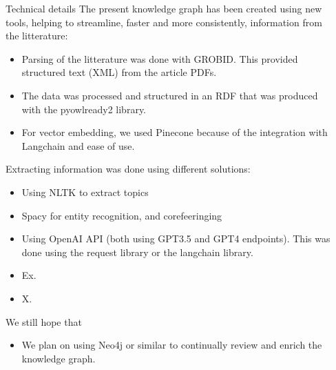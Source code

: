 \documentclass[final]{beamer}
\newlength{\sepmargin}
\newlength{\onecolwid}
\begin{document}
\begin{frame}[t]
\begin{columns}[t]
\begin{column}{\onecolwid}
         \begin{block}{Technical details}
          The present knowledge graph has been created using new tools, helping to streamline, faster and more consistently, information from the litterature:
           \begin{itemize}
\item Parsing of the litterature was done with GROBID. This provided structured text (XML) from the article PDFs. 
\item The data was processed and structured in an RDF that was produced with the pyowlready2 library.
\item For vector embedding, we used Pinecone because of the integration with Langchain and ease of use.

 \end{itemize}
Extracting information was done using different solutions:
           \begin{itemize}
\item Using NLTK to extract topics

\item Spacy for entity recognition, and corefeeringing


\item Using OpenAI API (both using GPT3.5 and GPT4 endpoints). This was done using the request library or the langchain library.

\item Ex.

\item X.
                     \end{itemize}
                     We still hope that
                                \begin{itemize}
\item We plan on using Neo4j or similar to continually review and enrich the knowledge graph.
                     \end{itemize}
          \end{block}
          
      \end{column}
      
      \begin{column}{\sepmargin} \end{column}
      \end{columns} 
       

\end{frame}
\end{document}
